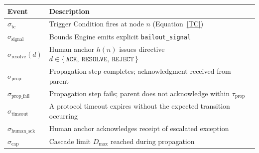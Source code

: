 \medskip
\noindent\begin{minipage}{\linewidth}
\label{tab:bp-events}
\medskip
\noindent\begin{tabular}{lp{7.5cm}}
\toprule
\textbf{Event} & \textbf{Description} \\
\midrule
$\sigma_{\text{tc}}$        & Trigger Condition fires at node $n$ (Equation~\ref{TC}) \\
$\sigma_{\text{signal}}$    & Bounds Engine emits explicit \texttt{bailout\_signal} \\
$\sigma_{\text{resolve}}(d)$ & Human anchor $h(n)$ issues directive $d \in \{\,\texttt{ACK},\ \texttt{RESOLVE},\ \texttt{REJECT}\,\}$ \\
$\sigma_{\text{prop}}$       & Propagation step completes; acknowledgment received from parent \\
$\sigma_{\text{prop\_fail}}$ & Propagation step fails; parent does not acknowledge within $\tau_{\text{prop}}$ \\
$\sigma_{\text{timeout}}$    & A protocol timeout expires without the expected transition occurring \\
$\sigma_{\text{human\_ack}}$ & Human anchor acknowledges receipt of escalated exception \\
$\sigma_{\text{cap}}$        & Cascade limit $D_{\max}$ reached during propagation \\
\bottomrule
\end{tabular}
\end{minipage}

